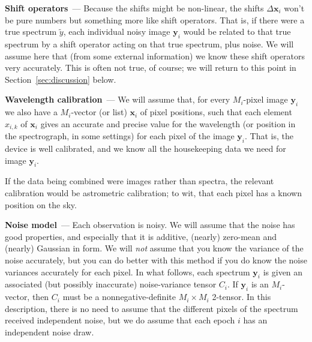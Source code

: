 \documentclass[modern, linenumbers]{aastex631}
\renewcommand{\paragraph}[1]{\medskip\par\noindent\textbf{#1}~---}
\newcommand{\sectionname}{Section}
\newcommand{\secref}[1]{\sectionname~\ref{#1}}
\newcommand{\modified}[1]{\textcolor{Emerald}{\textbf{#1}}}
\begin{document}
\paragraph{Shift operators}
Because the shifts might be non-linear, the shifts \modified{$\Delta\mathbf{x}_i$} won't be pure numbers but something more like shift operators.
That is, if there were a true spectrum $\tilde{y}$, each individual noisy image \modified{$\mathbf{y}_i$} would be related to that true spectrum by a shift operator acting on that true spectrum, plus noise.
We will assume here that (from some external information) we know these shift operators very accurately.
This is often not true, of course; we will return to this point in \secref{sec:discussion} below.

\paragraph{Wavelength calibration}
We will assume that, for every $M_i$-pixel image \modified{$\mathbf{y}_i$} we also have a $M_i$-vector (or list) \modified{$\mathbf{x}_i$} of pixel positions, such that each element \modified{$x_{i,k}$} of \modified{$\mathbf{x}_i$} gives an accurate and precise value for the wavelength (or position in the spectrograph, in some settings) for each pixel of the image \modified{$\mathbf{y}_i$}.
That is, the device is well calibrated, and we know all the housekeeping data we need for image \modified{$\mathbf{y}_i$}.

If the data being combined were images rather than spectra, the relevant calibration would be astrometric calibration; to wit, that each pixel has a known position on the sky.

\paragraph{Noise model}
Each observation is noisy.
We will assume that the noise has good properties, and especially that it is additive, (nearly) zero-mean and (nearly) Gaussian in form.
We will \emph{not} assume that you know the variance of the noise accurately, but you can do better with this method if you do know the noise variances accurately for each pixel.
In what follows, each spectrum \modified{$\mathbf{y}_i$} is given an associated (but possibly inaccurate) noise-variance tensor $C_i$.
If \modified{$\mathbf{y}_i$} is an $M_i$-vector, then $C_i$ must be a nonnegative-definite $M_i\times M_i$ 2-tensor.
In this description, there is no need to assume that the different pixels of the spectrum received independent noise, but we do assume that each epoch $i$ has an independent noise draw.
\end{document}
